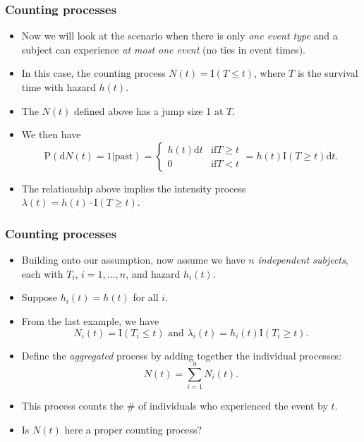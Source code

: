 \documentclass[10pt]{beamer}\usepackage[]{graphicx}\usepackage[]{color}
\newcommand{\dif}{\mathrm{d}}
\newcommand{\empr}[1]{{\emph{\color{red}#1}}}
\newcommand{\I}{\mathrm{I}}
\newcommand{\p}{\mathrm{P}}
\begin{document}
\begin{frame}
  \frametitle{Counting processes}
  \begin{itemize}  
  \item Now we will look at the scenario when there is only \empr{one event type} and a subject can experience \empr{at most one event} (no ties in event times).
  \item In this case, the counting process $N(t) = \I(T \le t)$, 
    where $T$ is the survival time with hazard $h(t)$.
  \item The $N(t)$ defined above has a jump size 1 at $T$.
  \item We then have
    \begin{equation*}
      \p(\dif N(t) = 1 |\mbox{past}) = \left\{\begin{matrix}
      h(t)\dif t & \mbox{if} T \ge t\\ 
      0 & \mbox{if} T < t
      \end{matrix}\right.
      = h(t)\I(T\ge t) \dif t. 
    \end{equation*}
  \item The relationship above implies the intensity process $\lambda(t) = h(t)\cdot \I(T\ge t)$.
  \end{itemize}
\end{frame} 


\begin{frame}
  \frametitle{Counting processes}
  \begin{itemize}  
  \item Building onto our assumption, now assume we have \empr{$n$ independent subjects},
    each with $T_i$, $i = 1, \ldots, n$, and hazard $h_i(t)$.
  \item Suppose $h_i(t) = h(t)$ for all $i$.
  \item From the last example, we have 
    $$N_i(t) = \I(T_i\le t) \mbox{ and }\lambda_i(t) = h_i(t) \I(T_i\ge t).$$
  \item Define the \empr{aggregated} process by adding together the individual processes:
    $$N(t) = \sum_{i = 1}^nN_i(t).$$
  \item This process counts the \# of individuals who experienced the event by $t$.
  \item Is $N(t)$ here a proper counting process?
  \end{itemize}
\end{frame} 
\end{document}
